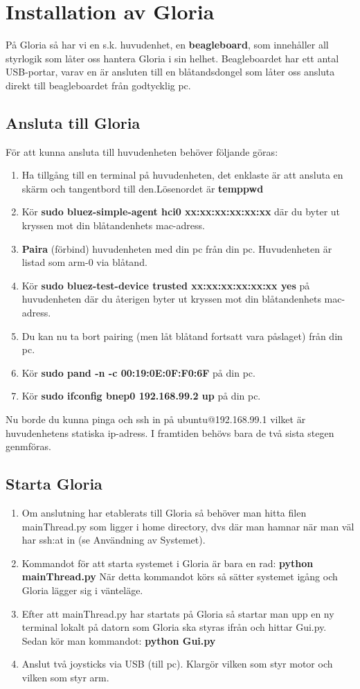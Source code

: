 \section{Installation av Gloria}
På Gloria så har vi en s.k. huvudenhet, en \textbf{beagleboard}, som innehåller all styrlogik som låter oss hantera Gloria i sin helhet. Beagleboardet har ett antal USB-portar, varav en är ansluten till en blåtandsdongel som låter oss ansluta direkt till beagleboardet från godtycklig pc.

\subsection{Ansluta till Gloria}
För att kunna ansluta till huvudenheten behöver följande göras:
\begin{enumerate}
	\item Ha tillgång till en terminal på huvudenheten, det enklaste är att ansluta en skärm och tangentbord till den.\newline Lösenordet är \textbf{temppwd}
	\item Kör \textbf{sudo bluez-simple-agent hci0 xx:xx:xx:xx:xx:xx} där du byter ut kryssen mot din blåtandenhets mac-adress.
	\item \textbf{Paira} (förbind) huvudenheten med din pc från din pc. Huvudenheten är listad som arm-0 via blåtand.
	\item Kör \textbf{sudo bluez-test-device trusted xx:xx:xx:xx:xx:xx yes} på huvudenheten där du återigen byter ut kryssen mot din blåtandenhets mac-adress.
	\item Du kan nu ta bort pairing (men låt blåtand fortsatt vara påslaget) från din pc.
	\item Kör \textbf{sudo pand -n -c 00:19:0E:0F:F0:6F	} på din pc.
	\item Kör \textbf{sudo ifconfig bnep0 192.168.99.2 up } på din pc.
\end{enumerate}
Nu borde du kunna pinga och ssh in på ubuntu@192.168.99.1 vilket är huvudenhetens statiska ip-adress. I framtiden behövs bara de två sista stegen genmföras.
\subsection{Starta Gloria}
\begin{enumerate}
	\item Om anslutning har etablerats till Gloria så behöver man hitta filen mainThread.py som ligger i home directory, dvs där man hamnar när man väl har ssh:at in (se Användning av Systemet).
	\item Kommandot för att starta systemet i Gloria är bara en rad: \textbf{python mainThread.py}
	När detta kommandot körs så sätter systemet igång och Gloria lägger sig i vänteläge.
	\item Efter att mainThread.py har startats på Gloria så startar man upp en ny terminal lokalt på datorn som Gloria ska styras ifrån och hittar Gui.py. Sedan kör man kommandot: \textbf{python Gui.py}
	\item Anslut två joysticks via USB (till pc). Klargör vilken som styr motor och vilken som styr arm.
\end{enumerate}
